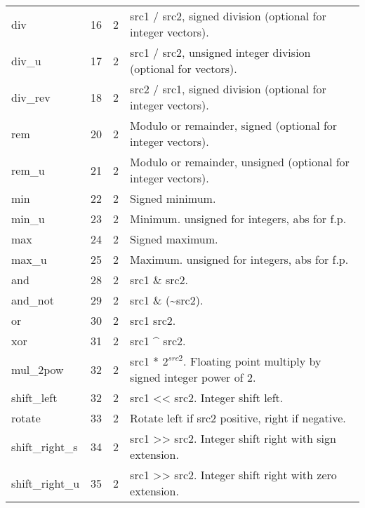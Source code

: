 \documentclass[forwardcom.tex]{subfiles}
\begin{document}
\begin{longtable} {|p{18mm}|p{9mm}|p{9mm}|p{76mm}|}
div          & 16 & 2 & src1 / src2, signed division (optional for integer vectors). \\
div\_u       & 17 & 2 & src1 / src2, unsigned integer division (optional for vectors). \\
div\_rev     & 18 & 2 & src2 / src1, signed division (optional for integer vectors). \\
rem          & 20 & 2 & Modulo or remainder, signed (optional for integer vectors). \\
rem\_u       & 21 & 2 & Modulo or remainder, unsigned (optional for integer vectors). \\
min          & 22 & 2 & Signed minimum. \\
min\_u       & 23 & 2 & Minimum. unsigned for integers, abs for f.p. \\
max          & 24 & 2 & Signed maximum. \\
max\_u       & 25 & 2 & Maximum. unsigned for integers, abs for f.p. \\
and          & 28 & 2 & src1 \& src2. \\
and\_not     & 29 & 2 & src1 \& (\~{}src2). \\
or           & 30 & 2 & src1 \textbar{} src2. \\
xor          & 31 & 2 & src1 \^{} src2. \\
mul\_2pow    & 32 & 2 & src1 * $2^{src2}$. Floating point multiply by signed integer power of 2. \\
shift\_left  & 32 & 2 & src1 \textless\textless{} src2. Integer shift left. \\
rotate       & 33 & 2 & Rotate left if src2 positive, right if negative. \\
shift\_right\_s & 34 & 2 & src1 \textgreater\textgreater{} src2. Integer shift right with sign extension. \\
shift\_right\_u & 35 & 2 & src1 \textgreater\textgreater{} src2. Integer shift right with zero extension. \\


\end{longtable}
\end{document}

